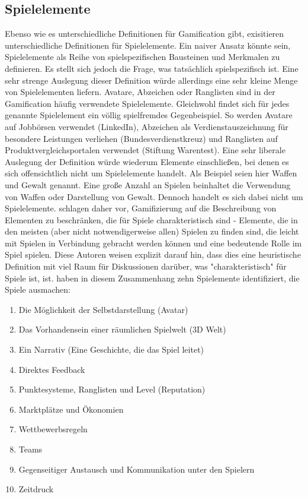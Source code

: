 \subsection{Spielelemente}
Ebenso wie es unterschiedliche Definitionen für Gamification gibt, exisitieren unterschiedliche Definitionen für Spielelemente. Ein naiver Ansatz könnte sein, Spielelemente als Reihe von spielspezifischen Bausteinen und Merkmalen zu definieren. Es stellt sich jedoch die Frage, was tatsächlich spielspezifisch ist. Eine sehr strenge Auslegung dieser Definition würde allerdings eine sehr kleine Menge von Spielelementen liefern. Avatare, Abzeichen oder Ranglisten sind in der Gamification häufig verwendete Spielelemente. Gleichwohl findet sich für jedes genannte Spielelement ein völlig spielfremdes Gegenbeispiel. So werden Avatare auf Jobbörsen verwendet (LinkedIn), Abzeichen als Verdienstauszeichnung für besondere Leistungen verliehen (Bundesverdienstkreuz) und Ranglisten auf Produktvergleichsportalen verwendet (Stiftung Warentest). Eine sehr liberale Auslegung der Definition würde wiederum Elemente einschließen, bei denen es sich offensichtlich nicht um Spielelemente handelt. Als Beispiel seien hier Waffen und Gewalt genannt. Eine große Anzahl an Spielen beinhaltet die Verwendung von Waffen oder Darstellung von Gewalt. Dennoch handelt es sich dabei nicht um Spielelemente.  schlagen daher vor, Gamifizierung auf die Beschreibung von Elementen zu beschränken, die für Spiele charakteristisch sind - Elemente, die in den meisten (aber nicht notwendigerweise allen) Spielen zu finden sind, die leicht mit Spielen in Verbindung gebracht werden können und eine bedeutende Rolle im Spiel spielen. Diese Autoren weisen explizit darauf hin, dass dies eine heuristische Definition mit viel Raum für Diskussionen darüber, was "charakteristisch" für Spiele ist, ist.  haben in diesem Zusammenhang zehn Spielemente identifiziert, die  Spiele ausmachen:

\begin{enumerate}
  \item Die Möglichkeit der Selbstdarstellung (Avatar)
  \item Das Vorhandensein einer räumlichen Spielwelt (3D Welt)
  \item Ein Narrativ (Eine Geschichte, die das Spiel leitet)
  \item Direktes Feedback
  \item Punktesysteme, Ranglisten und Level (Reputation)
  \item Marktplätze und Ökonomien
  \item Wettbewerbsregeln 
  \item Teams
  \item Gegenseitiger Austausch und Kommunikation unter den Spielern
  \item Zeitdruck
\end{enumerate}

